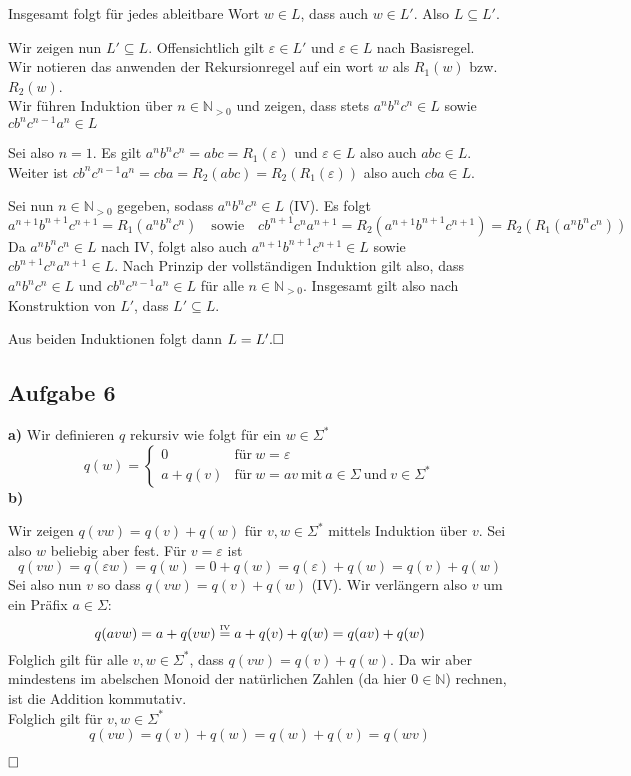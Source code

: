 \documentclass[a4paper,graphics,11pt]{article}
\newcommand{\aufgabe}[1]{\subsection*{Aufgabe #1}}
\newcommand{\up}[2]{\mathrel{\overset{\makebox[0pt]{\mbox{\normalfont\tiny #2}}}{#1}}}
\begin{document}
Insgesamt folgt für jedes ableitbare Wort $w \in L$, dass auch $w \in L'$. Also $L \subseteq L'$.
\newpage

Wir zeigen nun $L' \subseteq L$.
Offensichtlich gilt $\varepsilon \in L'$ und $\varepsilon \in L$ nach Basisregel.\\
Wir notieren das anwenden der Rekursionregel auf ein wort $w$ als $R_1(w)$ bzw. $R_2(w)$.\\
Wir führen Induktion über $n \in \mathbb{N}_{> 0}$ und zeigen, dass stets $a^nb^nc^n \in L$ sowie $cb^nc^{n-1}a^n \in L$

Sei also $n = 1$. Es gilt
$
    a^nb^nc^n = abc = R_1(\varepsilon)
$
und $\varepsilon \in L$ also auch $abc \in L$. Weiter ist
$cb^nc^{n-1}a^n = cba = R_2(abc) = R_2(R_1(\varepsilon))$ also auch $cba \in L$.

Sei nun $n \in \mathbb{N}_{>0}$ gegeben, sodass $a^nb^nc^n \in L$ (IV). Es folgt
$$
    a^{n+1}b^{n+1}c^{n+1} = R_1(a^nb^nc^n)
    \quad\text{sowie}\quad
    cb^{n+1}c^na^{n+1} = R_2(a^{n+1}b^{n+1}c^{n+1}) = R_2(R_1(a^nb^nc^n))
$$
Da $a^nb^nc^n \in L$ nach IV, folgt also auch $a^{n+1}b^{n+1}c^{n+1} \in L$ sowie $cb^{n+1}c^na^{n+1} \in L$.
Nach Prinzip der vollständigen Induktion gilt also, dass $a^nb^nc^n \in L$ und $cb^nc^{n-1}a^n \in L$ für
alle $n \in \mathbb{N}_{>0}$. Insgesamt gilt also nach Konstruktion von $L'$, dass $L' \subseteq L$.

Aus beiden Induktionen folgt dann $L = L'.\hfill\square$

\aufgabe{6}
\textbf{a)}
Wir definieren $q$ rekursiv wie folgt für ein $w \in \Sigma^*$
$$
    q(w) = \begin{cases}
        0 & \text{für}\ w = \varepsilon\\
        a + q(v) & \text{für}\ w = av\ \text{mit}\ a \in \Sigma\ \text{und}\ v \in \Sigma^*
    \end{cases}
$$
\textbf{b)}

Wir zeigen $q(vw) = q(v) + q(w)$ für $v,w \in \Sigma^*$ mittels Induktion über $v$. Sei also $w$ beliebig aber fest.
Für $v = \varepsilon$ ist
$$
    q(vw)
    = q(\varepsilon w)
    = q(w)
    = 0 + q(w)
    = q(\varepsilon) + q(w)
    = q(v) + q(w)
$$
Sei also nun $v$ so dass $q(vw) = q(v) + q(w)$ (IV). Wir verlängern also $v$ um ein Präfix $a \in \Sigma$:
$$
    q(avw)
    = a + q(vw)
    \up{=}{IV} a + q(v) + q(w)
    = q(av) + q(w)
$$
Folglich gilt für alle $v,w \in \Sigma^*$, dass $q(vw) = q(v) + q(w)$. Da wir aber mindestens im abelschen
Monoid der natürlichen Zahlen (da hier $0 \in \mathbb{N}$) rechnen, ist die Addition kommutativ.\\
Folglich gilt für $v,w \in \Sigma^*$
$$
    q(vw)
    = q(v) + q(w)
    = q(w) + q(v)
    = q(wv)
$$
\strut$\hfill\square$
\end{document}

